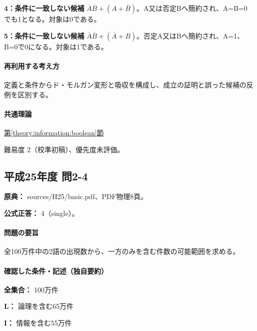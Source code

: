 \noindent\textbf{4：条件に一致しない候補} \(\overline A\overline B+(A+\overline B)\)。A又は否定Bへ簡約され、A=\allowbreak{}B=\allowbreak{}0でも1となる。対象は0である。\par

\noindent\textbf{5：条件に一致しない候補} \(\overline A\overline B+(\overline A+B)\)。否定A又はBへ簡約され、A=\allowbreak{}1、B=\allowbreak{}0で0になる。対象は1である。\par

\paragraph{再利用する考え方} 定義と条件からド・モルガン変形と吸収を構成し、成立の証明と誤った候補の反例を区別する。

\paragraph{共通理論} \hyperref[theory:information:boolean]{第\ref*{theory:information:boolean}節}

\par 難易度 2（校準初稿）、優先度未評価。

\subsection{平成25年度 問2-4}
\label{q:h25-reg-basic-2-4}

\noindent\textbf{原典：} sources/H25/basic.pdf、PDF物理8頁。

\textbf{公式正答：} 4（single）。

\paragraph{問題の要旨} 全100万件中の2語の出現数から、一方のみを含む件数の可能範囲を求める。

\paragraph{確認した条件・記述（独自要約）}\mbox{}\par

\noindent\textbf{全集合：} 100万件\par

\noindent\textbf{L：} 論理を含む65万件\par

\noindent\textbf{I：} 情報を含む55万件\par

